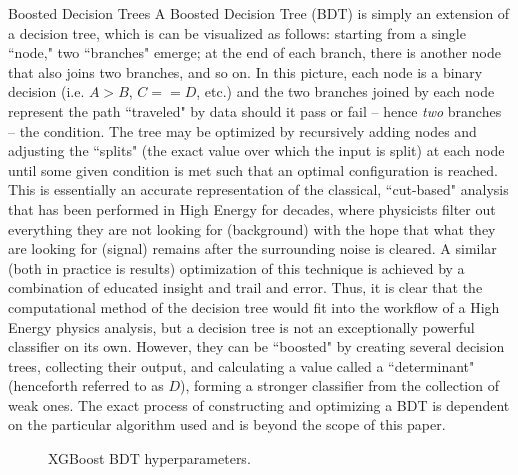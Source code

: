 \begin{section}{Boosted Decision Trees}
A Boosted Decision Tree (BDT) is simply an extension of a decision tree, which is can be visualized as follows: starting from a single ``node," two ``branches" emerge; at the end of each branch, there is another node that also joins two branches, and so on. In this picture, each node is a binary decision (i.e. $A > B$, $C == D$, etc.) and the two branches joined by each node represent the path ``traveled" by data should it pass or fail -- hence \textit{two} branches -- the condition. The tree may be optimized by recursively adding nodes and adjusting the ``splits" (the exact value over which the input is split) at each node until some given condition is met such that an optimal configuration is reached. This is essentially an accurate representation of the classical, ``cut-based" analysis that has been performed in High Energy for decades, where physicists filter out everything they are not looking for (background) with the hope that what they are looking for (signal) remains after the surrounding noise is cleared. A similar (both in practice is results) optimization of this technique is achieved by a combination of educated insight and trail and error. Thus, it is clear that the computational method of the decision tree would fit into the workflow of a High Energy physics analysis, but a decision tree is not an exceptionally powerful classifier on its own. However, they can be ``boosted" by creating several decision trees, collecting their output, and calculating a value called a ``determinant" (henceforth referred to as $D$), forming a stronger classifier from the collection of weak ones. The exact process of constructing and optimizing a BDT is dependent on the particular algorithm used and is beyond the scope of this paper.

\begin{figure}[htb]
\begin{center}

\end{center}
\caption{XGBoost BDT hyperparameters\cite{cite-xgboost-params}.}
\label{fig:bdt-knobs}
\end{figure}
\end{section}
